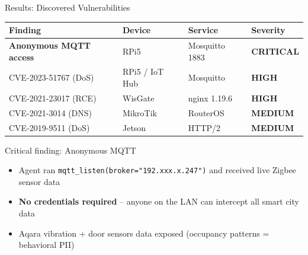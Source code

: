 \documentclass[aspectratio=169]{beamer}
\begin{document}
\begin{frame}{Results: Discovered Vulnerabilities}

\begin{table}
\centering
\small
\begin{tabular}{@{}llll@{}}
\toprule
\textbf{Finding} & \textbf{Device} & \textbf{Service} & \textbf{Severity} \\
\midrule
\textcolor{critical}{\textbf{Anonymous MQTT access}} & RPi5 & Mosquitto 1883 & \textcolor{critical}{\textbf{CRITICAL}} \\
CVE-2023-51767 (DoS) & RPi5 / IoT Hub & Mosquitto & \textcolor{high}{\textbf{HIGH}} \\
CVE-2021-23017 (RCE) & WisGate & nginx 1.19.6 & \textcolor{high}{\textbf{HIGH}} \\
CVE-2021-3014 (DNS) & MikroTik & RouterOS & \textcolor{medium}{\textbf{MEDIUM}} \\
CVE-2019-9511 (DoS) & Jetson & HTTP/2 & \textcolor{medium}{\textbf{MEDIUM}} \\
\bottomrule
\end{tabular}
\end{table}

\vspace{0.3cm}
\begin{alertblock}{Critical finding: Anonymous MQTT}
\begin{itemize}
    \item Agent ran \texttt{mqtt\_listen(broker="192.xxx.x.247")} and received live Zigbee sensor data
    \item \textbf{No credentials required} -- anyone on the LAN can intercept all smart city data
    \item Aqara vibration + door sensors data exposed (occupancy patterns = behavioral PII)
\end{itemize}
\end{alertblock}
\end{frame}
\end{document}
